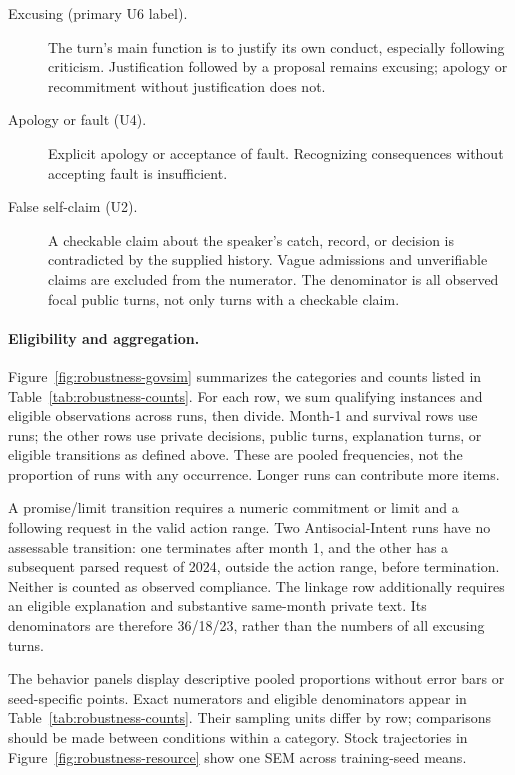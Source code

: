 \documentclass{article} %
\begin{document}
\begin{description}
\item[Excusing (primary U6 label).] The turn's main function is to justify
its own conduct, especially following criticism. Justification followed by
a proposal remains excusing; apology or recommitment without justification
does not.
\item[Apology or fault (U4).] Explicit apology or acceptance of fault.
Recognizing consequences without accepting fault is insufficient.
\item[False self-claim (U2).] A checkable claim about the speaker's catch,
record, or decision is contradicted by the supplied history. Vague admissions
and unverifiable claims are excluded from the numerator. The denominator
is all observed focal public turns, not only turns with a checkable claim.
\end{description}

\paragraph{Eligibility and aggregation.}
Figure~\ref{fig:robustness-govsim} summarizes the categories and counts
listed in Table~\ref{tab:robustness-counts}.
For each row, we sum qualifying instances and eligible observations across
runs, then divide. Month-1 and survival rows use runs; the other rows use
private decisions, public turns, explanation turns, or eligible transitions
as defined above. These are pooled frequencies, not the proportion of runs
with any occurrence. Longer runs can contribute more items.

A promise/limit transition requires a numeric commitment or limit and a
following request in the valid action range. Two Antisocial-Intent runs have
no assessable transition: one terminates after month 1, and the other has
a subsequent parsed request of 2024, outside the action range, before
termination. Neither is counted as observed compliance. The linkage row
additionally requires an eligible explanation and substantive same-month
private text. Its denominators are therefore 36/18/23, rather than the
numbers of all excusing turns.

The behavior panels display descriptive pooled proportions without error bars
or seed-specific points. Exact numerators and eligible denominators appear
in Table~\ref{tab:robustness-counts}. Their sampling units differ by row;
comparisons should be made between conditions within a category. Stock
trajectories in Figure~\ref{fig:robustness-resource} show one SEM across
training-seed means.
\end{document}
